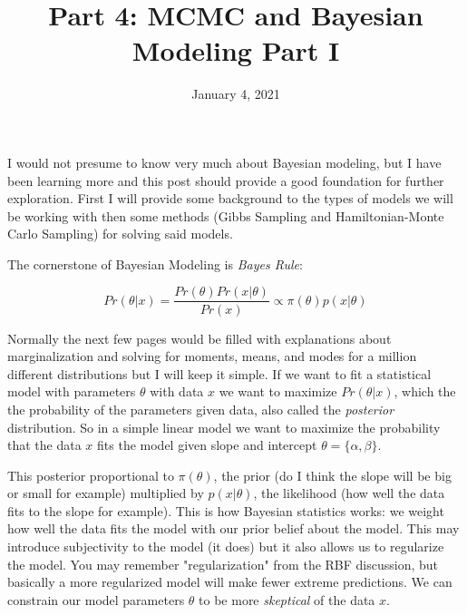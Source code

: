 \documentclass[12pt]{article}
\title{\textbf{Part 4: MCMC and Bayesian Modeling Part I}}
\begin{document}
\date{January 4, 2021}
\maketitle

I would not presume to know very much about Bayesian modeling, but I have been learning more and this post should provide a good foundation for further exploration. First I will provide some background to the types of models we will be working with then some methods (Gibbs Sampling and Hamiltonian-Monte Carlo Sampling) for solving said models.

\vspace{5mm}

The cornerstone of Bayesian Modeling is \emph{Bayes Rule}:

\begin{equation}
Pr(\theta | x) = \dfrac{Pr(\theta) Pr(x | \theta)}{Pr(x)} \propto \pi(\theta) p(x | \theta)
\end{equation}

Normally the next few pages would be filled with explanations about marginalization and solving for moments, means, and modes for a million different distributions but I will keep it simple. If we want to fit a statistical model with parameters $\theta$ with data $x$ we want to maximize $Pr(\theta | x)$, which the the probability of the parameters given data, also called the \emph{posterior} distribution. So in a simple linear model we want to maximize the probability that the data $x$ fits the model given slope and intercept $\theta = \{\alpha,\beta\}$.

\vspace{5mm}

This posterior proportional to $\pi(\theta)$, the prior (do I think the slope will be big or small for example) multiplied by $p(x | \theta)$, the likelihood (how well the data fits to the slope for example). This is how Bayesian statistics works: we weight how well the data fits the model with our prior belief about the model. This may introduce subjectivity to the model (it does) but it also allows us to regularize the model. You may remember "regularization" from the RBF discussion, but basically a more regularized model will make fewer extreme predictions. We can constrain our model parameters $\theta$ to be more \emph{skeptical} of the data $x$. 
\end{document}
